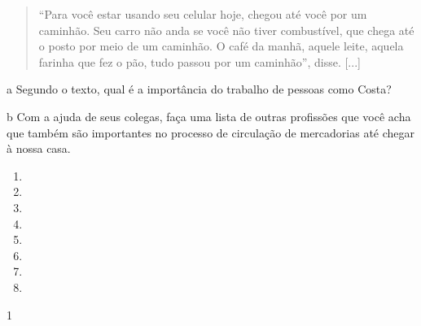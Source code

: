\begin{itemize}
\begin{itemize}
\begin{itemize}
\begin{itemize}
{{\begin{itemize}
\begin{itemize}
\begin{quote}
``Para você estar usando seu celular hoje, chegou até você por um
caminhão. Seu carro não anda se você não tiver combustível, que chega
até o posto por meio de um caminhão. O café da manhã, aquele leite,
aquela farinha que fez o pão, tudo passou por um caminhão'', disse. [...]

\end{quote}

\num{a} Segundo o texto, qual é a importância do trabalho de pessoas como Costa?


\num{b} Com a ajuda de seus colegas, faça uma lista de outras profissões que
você acha que também são importantes no processo de circulação de
mercadorias até chegar à nossa casa.

\begin{enumerate}
\item \preencher

\item \preencher

\item \preencher

\item \preencher

\item \preencher

\item \preencher

\item \preencher

\item \preencher
\end{enumerate}



\num{1}


\end{itemize}
\end{itemize}}}
\end{itemize}
\end{itemize}
\end{itemize}
\end{itemize}
